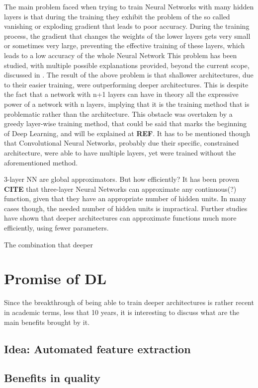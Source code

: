 \documentclass[a4paper]{report}
\begin{document}
		The main problem faced when trying to train Neural Networks with many hidden layers is that during the training they exhibit the problem of the so called vanishing or exploding gradient that leads to poor accuracy. During the training process, the gradient that changes the weights of the lower layers gets very small or sometimes very large, preventing the effective training of these layers, which leads to a low accuracy of the whole Neural Network \cite{Bengio2009} This problem has been studied, with multiple possible explanations provided, beyond the current scope, discussed in \cite{Bengio2007}. The result of the above problem is that shallower architectures, due to their easier training, were outperforming deeper architectures. This is despite the fact that a network with n+1 layers can have in theory all the expressive power of a network with n layers, implying that it is the training method that is problematic rather than the architecture. This obstacle was overtaken by a greedy layer-wise training method, that could be said that marks the beginning of Deep Learning, and will be explained at \textbf{REF}. It has to be mentioned though that Convolutional Neural Networks, probably due their specific, constrained architecture, were able to have multiple layers, yet were trained without the aforementioned method. 
		
		3-layer NN are global approximators. But how efficiently?
		It has been proven \textbf{CITE} that three-layer Neural Networks can approximate any continuous(?)  function, given that they have an appropriate number of hidden units.
		In many cases though, the needed number of hidden units  is impractical. Further studies have shown that deeper architectures can approximate functions much more efficiently, using fewer parameters.
		
		The combination that deeper 
		
\section{Promise of DL}
	Since the breakthrough of being able to train deeper architectures is rather recent in academic terms, less that 10 years, it is interesting to discuss what are the main benefits brought by it.
	\subsection{Idea: Automated feature extraction}
	\subsection{Benefits in quality}
\end{document}
